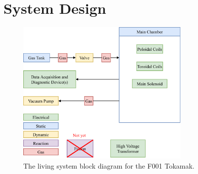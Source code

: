 \documentclass[11pt]{article}
\begin{document}
	\section{System Design}
	\begin{figure}[hbt!]
		\centering
		\includegraphics[width=0.75\textwidth]{images/F001_system_block_diagram.pdf}
		\captionsetup{width=\textwidth}
		\caption{The living system block diagram for the F001 Tokamak.}
		\label{fig:F001_system_block_diagram}
	\end{figure}
	
	
\end{document}
